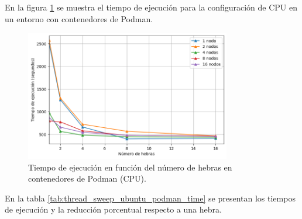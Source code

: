 En la figura \ref{fig:thread_sweep_ubuntu_podman_time} se muestra el tiempo de ejecución para la configuración de CPU en un entorno con contenedores de Podman.

\begin{figure}[H]
    \centering
    \includegraphics[width=0.8\textwidth]{imagenes/cap5/thread_sweep_ubuntu_podman_time.png}
    \caption{Tiempo de ejecución en función del número de hebras en contenedores de Podman (CPU).}
    \label{fig:thread_sweep_ubuntu_podman_time}
\end{figure}

En la tabla \ref{tab:thread_sweep_ubuntu_podman_time} se presentan los tiempos de ejecución y la reducción porcentual respecto a una hebra.

